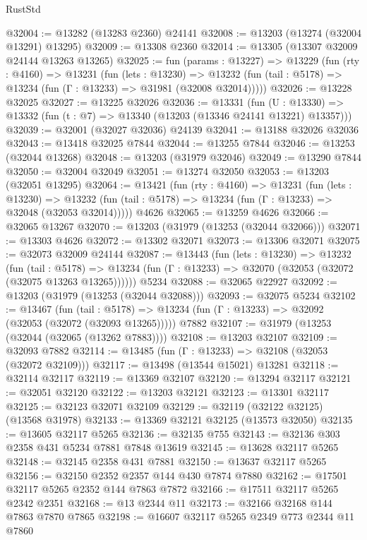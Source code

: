 \begin{lexlean}{RustStd}
\begin{coremodule}
@32004 := @13282 (@13283 @2360) @24141
@32008 := @13203 (@13274 (@32004 @13291) @13295)
@32009 := @13308 @2360
@32014 := @13305 (@13307 @32009 @24144 @13263 @13265)
@32025 := fun (params : @13227) =>
  @13229
    (fun (rty : @4160) =>
    @13231
      (fun (lets : @13230) =>
      @13232 (fun (tail : @5178) => @13234 (fun (Γ : @13233) => @31981 (@32008 @32014)))))
@32026 := @13228 @32025
@32027 := @13225 @32026
@32036 := @13331
    (fun (U : @13330) => @13332 (fun (t : @7) => @13340 (@13203 (@13346 @24141 @13221) @13357)))
@32039 := @32001 (@32027 @32036) @24139
@32041 := @13188 @32026 @32036
@32043 := @13418 @32025 @7844
@32044 := @13255 @7844
@32046 := @13253 (@32044 @13268)
@32048 := @13203 (@31979 @32046)
@32049 := @13290 @7844
@32050 := @32004 @32049
@32051 := @13274 @32050
@32053 := @13203 (@32051 @13295)
@32064 := @13421
    (fun (rty : @4160) =>
    @13231
      (fun (lets : @13230) =>
      @13232 (fun (tail : @5178) => @13234 (fun (Γ : @13233) => @32048 (@32053 @32014)))))
    @4626
@32065 := @13259 @4626
@32066 := @32065 @13267
@32070 := @13203 (@31979 (@13253 (@32044 @32066)))
@32071 := @13303 @4626
@32072 := @13302 @32071
@32073 := @13306 @32071
@32075 := @32073 @32009 @24144
@32087 := @13443
    (fun (lets : @13230) =>
    @13232
      (fun (tail : @5178) =>
      @13234 (fun (Γ : @13233) => @32070 (@32053 (@32072 (@32075 @13263 @13265))))))
    @5234
@32088 := @32065 @22927
@32092 := @13203 (@31979 (@13253 (@32044 @32088)))
@32093 := @32075 @5234
@32102 := @13467
    (fun (tail : @5178) => @13234 (fun (Γ : @13233) => @32092 (@32053 (@32072 (@32093 @13265)))))
    @7882
@32107 := @31979 (@13253 (@32044 (@32065 (@13262 @7883))))
@32108 := @13203 @32107
@32109 := @32093 @7882
@32114 := @13485 (fun (Γ : @13233) => @32108 (@32053 (@32072 @32109)))
@32117 := @13498 (@13544 @15021) @13281
@32118 := @32114 @32117
@32119 := @13369 @32107
@32120 := @13294 @32117
@32121 := @32051 @32120
@32122 := @13203 @32121
@32123 := @13301 @32117
@32125 := @32123 @32071 @32109
@32129 := @32119 (@32122 @32125) (@13568 @31978)
@32133 := @13369 @32121 @32125 (@13573 @32050)
@32135 := @13605 @32117 @5265
@32136 := @32135 @755
@32143 := @32136 @303 @2358 @431 @5234 @7881 @7848 @13619
@32145 := @13628 @32117 @5265
@32148 := @32145 @2358 @431 @7881
@32150 := @13637 @32117 @5265
@32156 := @32150 @2352 @2357 @144 @430 @7874 @7880
@32162 := @17501 @32117 @5265 @2352 @144 @7863 @7872
@32166 := @17511 @32117 @5265 @2342 @2351
@32168 := @13 @2344 @11
@32173 := @32166 @32168 @144 @7863 @7870 @7865
@32198 := @16607
    @32117
    @5265
    @2349
    @773
    @2344
    @11
    @7860

\end{coremodule}
\end{lexlean}
